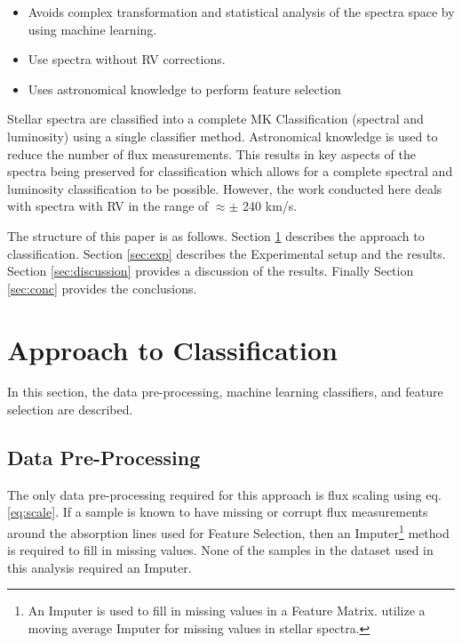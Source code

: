 \documentclass[trackchanges, floatfix, twocolumn, tighten]{aastex62}
\begin{document}
\begin{itemize}
	\item Avoids complex transformation and statistical analysis of the spectra space by using machine learning.
	\item Use spectra without RV corrections.
	\item Uses astronomical knowledge to perform feature selection
\end{itemize}

Stellar spectra are classified into a complete MK Classification (spectral and luminosity) using a single classifier method. Astronomical knowledge is used to reduce the number of flux measurements. This results in key aspects of the spectra being preserved for classification which allows for a complete spectral and luminosity classification to be possible. However, the work conducted here deals with spectra with RV in the range of $\approx \pm$ 240 km/s.

The structure of this paper is as follows. Section \ref{sec:Approach_B} describes the approach to classification. Section \ref{sec:exp} describes the Experimental setup and the results. Section \ref{sec:discussion} provides a discussion of the results. Finally Section \ref{sec:conc} provides the conclusions.

\section{Approach to Classification}\label{sec:Approach_B}

In this section, the data pre-processing, machine learning classifiers, and feature selection are described.

\subsection{Data Pre-Processing}

The only data pre-processing required for this approach is flux scaling using eq. \eqref{eq:scale}. If a sample is known to have missing or corrupt flux measurements around the absorption lines used for Feature Selection, then an Imputer\footnote{An Imputer is used to fill in missing values in a Feature Matrix. \cite{brice} utilize a moving average Imputer for missing values in stellar spectra.} method is required to fill in missing values. None of the  samples in the dataset used in this analysis required an Imputer.
\end{document}
